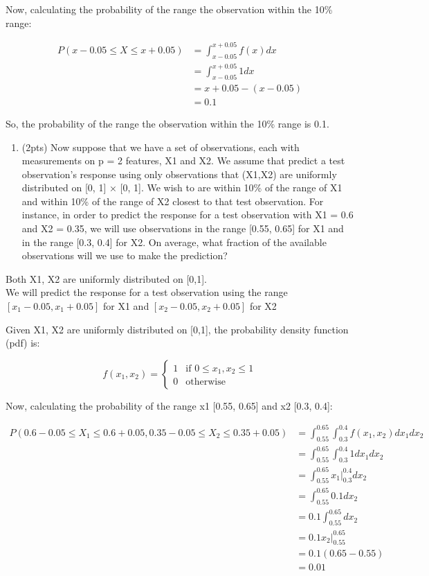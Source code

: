 \documentclass[11pt]{article}
\providecommand{\tightlist}{%
      \setlength{\itemsep}{0pt}\setlength{\parskip}{0pt}}
\begin{document}
Now, calculating the probability of the range the observation within the
10\% range:

\[  
\begin{align}
P(x - 0.05 \leq X \leq x + 0.05) &= \int_{x - 0.05}^{x + 0.05} f(x) dx \\
&= \int_{x - 0.05}^{x + 0.05} 1 dx \\
&= x + 0.05 - (x - 0.05) \\
&= 0.1
\end{align}
\]

So, the probability of the range the observation within the 10\% range
is 0.1.

    \begin{enumerate}
\def\labelenumi{(\alph{enumi})}
\setcounter{enumi}{1}
\tightlist
\item
  (2pts) Now suppose that we have a set of observations, each with
  measurements on p = 2 features, X1 and X2. We assume that predict a
  test observation's response using only observations that (X1,X2) are
  uniformly distributed on {[}0, 1{]} × {[}0, 1{]}. We wish to are
  within 10\% of the range of X1 and within 10\% of the range of X2
  closest to that test observation. For instance, in order to predict
  the response for a test observation with X1 = 0.6 and X2 = 0.35, we
  will use observations in the range {[}0.55, 0.65{]} for X1 and in the
  range {[}0.3, 0.4{]} for X2. On average, what fraction of the
  available observations will we use to make the prediction?
\end{enumerate}

    Both X1, X2 are uniformly distributed on {[}0,1{]}.\\
We will predict the response for a test observation using the range
\([x_{1} - 0.05, x_{1} + 0.05]\) for X1 and
\([x_{2} - 0.05, x_{2} + 0.05]\) for X2

Given X1, X2 are uniformly distributed on {[}0,1{]}, the probability
density function (pdf) is:

\[
f(x_{1}, x_{2}) = \begin{cases}
1 & \text{if } 0 \leq x_{1}, x_{2} \leq 1 \\
0 & \text{otherwise}
\end{cases}
\]

Now, calculating the probability of the range x1 {[}0.55, 0.65{]} and x2
{[}0.3, 0.4{]}:

\[
\begin{align}
P(0.6 - 0.05 \leq X_{1} \leq 0.6 + 0.05, 0.35 - 0.05 \leq X_{2} \leq 0.35 + 0.05) &= \int_{0.55}^{0.65} \int_{0.3}^{0.4} f(x_{1}, x_{2}) dx_{1} dx_{2} \\
&= \int_{0.55}^{0.65} \int_{0.3}^{0.4} 1 dx_{1} dx_{2} \\
&= \int_{0.55}^{0.65} x_{1} \Big|_{0.3}^{0.4} dx_{2} \\
&= \int_{0.55}^{0.65} 0.1 dx_{2} \\
&= 0.1 \int_{0.55}^{0.65} dx_{2} \\
&= 0.1 x_{2} \Big|_{0.55}^{0.65} \\
&= 0.1 (0.65 - 0.55) \\
&= 0.01
\end{align}
\]
\end{document}
